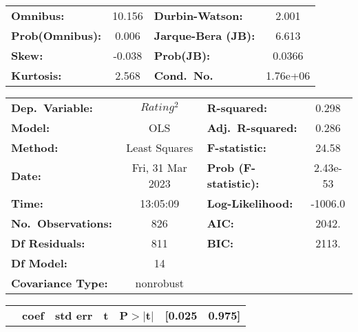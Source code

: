 \begin{center}
\begin{tabular}{lclc}
                    \textbf{Omnibus:}       & 10.156 & \textbf{  Durbin-Watson:     } & 2.001    \\
                    \textbf{Prob(Omnibus):} & 0.006  & \textbf{  Jarque-Bera (JB):  } & 6.613    \\
                    \textbf{Skew:}          & -0.038 & \textbf{  Prob(JB):          } & 0.0366   \\
                    \textbf{Kurtosis:}      & 2.568  & \textbf{  Cond.~No.          } & 1.76e+06 \\
                    \bottomrule
                \end{tabular}
            \end{center}

            \begin{center}
                \begin{tabular}{lclc}
                    \toprule
                    \textbf{Dep.~Variable:}    & $Rating^2$       & \textbf{  R-squared:         } & 0.298    \\
                    \textbf{Model:}            & OLS              & \textbf{  Adj.~R-squared:    } & 0.286    \\
                    \textbf{Method:}           & Least Squares    & \textbf{  F-statistic:       } & 24.58    \\
                    \textbf{Date:}             & Fri, 31 Mar 2023 & \textbf{  Prob (F-statistic):} & 2.43e-53 \\
                    \textbf{Time:}             & 13:05:09         & \textbf{  Log-Likelihood:    } & -1006.0  \\
                    \textbf{No.~Observations:} & 826              & \textbf{  AIC:               } & 2042.    \\
                    \textbf{Df Residuals:}     & 811              & \textbf{  BIC:               } & 2113.    \\
                    \textbf{Df Model:}         & 14               & \textbf{                     } &          \\
                    \textbf{Covariance Type:}  & nonrobust        & \textbf{                     } &          \\
                    \bottomrule
                \end{tabular}
                \begin{tabular}{lcccccc}
                                                     & \textbf{coef} & \textbf{std err} & \textbf{t} & \textbf{P$> |$t$|$} & \textbf{[0.025} & \textbf{0.975]} \\

\end{tabular}
\end{center}
